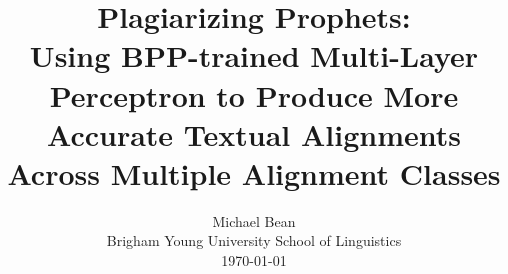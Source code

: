 \title{Plagiarizing Prophets:\\
Using BPP-trained Multi-Layer Perceptron to Produce More Accurate Textual Alignments Across Multiple Alignment Classes}

\author{Michael Bean\\
Brigham Young University School of Linguistics\\
\today}
\maketitle
